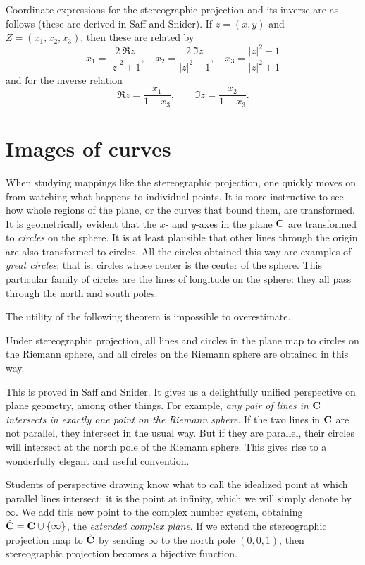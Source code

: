 \documentclass[twocolumn,12pt]{article}
\begin{document}
Coordinate expressions for the stereographic projection and its inverse are as follows (these are derived in Saff and Snider). If $z = (x, y)$ and $Z = (x_1, x_2, x_3)$, then these are related by
\[
    x_1 = \frac{2\ \Re{z}}{|z|^2 + 1}, \quad x_2 = \frac{2\ \Im{z}}{|z|^2 + 1}, \quad x_3 = \frac{|z|^2 - 1}{|z|^2 + 1}
\]
and for the inverse relation
\[
    \Re{z} = \frac{x_1}{1 - x_3}, \qquad \Im{z} = \frac{x_2}{1 - x_3}.
\]

\section{Images of curves} %
\label{sec:images_of_curves}
When studying mappings like the stereographic projection, one quickly moves on from watching what happens to individual points. It is more instructive to see how whole regions of the plane, or the curves that bound them, are transformed. It is geometrically evident that the $x$- and $y$-axes in the plane $\mathbf{C}$ are transformed to \emph{circles} on the sphere. It is at least plausible that other lines through the origin are also transformed to circles. All the circles obtained this way are examples of \emph{great circles}: that is, circles whose center is the center of the sphere. This particular family of circles are the lines of longitude on the sphere: they all pass through the north and south poles.

The utility of the following theorem is impossible to overestimate.
\begin{theorem} \label{thm:circlestocircles}
  Under stereographic projection, all lines and circles in the plane map to circles on the Riemann sphere, and all circles on the Riemann sphere are obtained in this way.
\end{theorem}
This is proved in Saff and Snider. It gives us a delightfully unified perspective on plane geometry, among other things. For example, \emph{any pair of lines in $\mathbf{C}$ intersects in exactly one point on the Riemann sphere}. If the two lines in $\mathbf{C}$ are not parallel, they intersect in the usual way. But if they are parallel, their circles will intersect at the north pole of the Riemann sphere. This gives rise to a wonderfully elegant and useful convention.

Students of perspective drawing know what to call the idealized point at which parallel lines intersect: it is the point at infinity, which we will simply denote by $\infty$. We add this new point to the complex number system, obtaining $\hat{\mathbf{C}} = \mathbf{C} \cup \{ \infty \}$, the \emph{extended complex plane}. If we extend the stereographic projection map to $\hat{\mathbf{C}}$ by sending $\infty$ to the north pole $(0, 0, 1)$, then stereographic projection becomes a bijective function.
\end{document}
